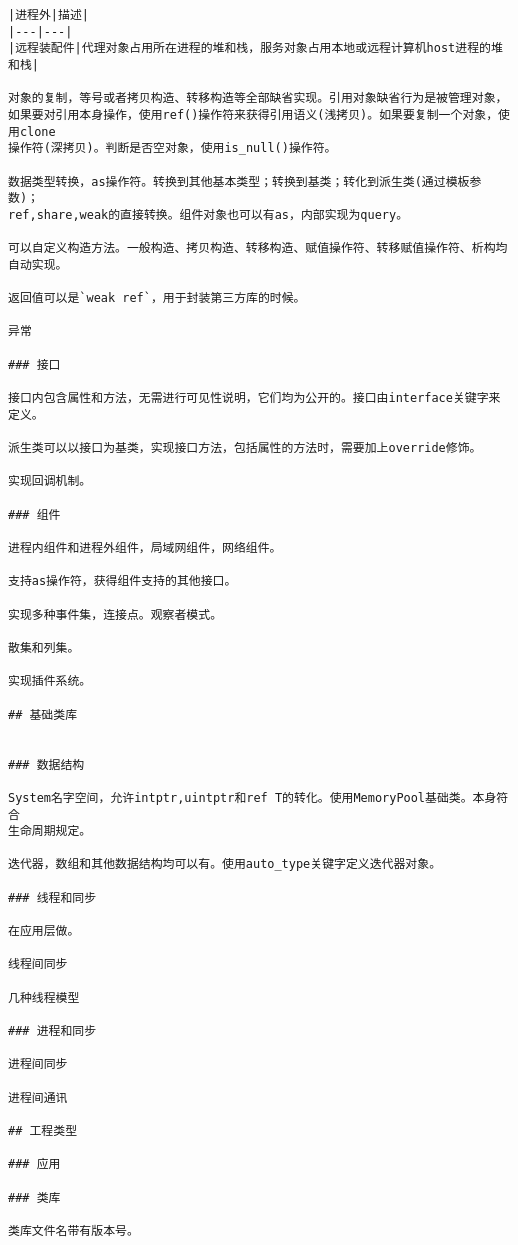 \begin{lstlisting}
|进程外|描述|
|---|---|
|远程装配件|代理对象占用所在进程的堆和栈，服务对象占用本地或远程计算机host进程的堆和栈|

对象的复制，等号或者拷贝构造、转移构造等全部缺省实现。引用对象缺省行为是被管理对象，
如果要对引用本身操作，使用ref()操作符来获得引用语义(浅拷贝)。如果要复制一个对象，使用clone
操作符(深拷贝)。判断是否空对象，使用is_null()操作符。

数据类型转换，as操作符。转换到其他基本类型；转换到基类；转化到派生类(通过模板参数)；
ref,share,weak的直接转换。组件对象也可以有as，内部实现为query。

可以自定义构造方法。一般构造、拷贝构造、转移构造、赋值操作符、转移赋值操作符、析构均自动实现。

返回值可以是`weak ref`，用于封装第三方库的时候。

异常

### 接口

接口内包含属性和方法，无需进行可见性说明，它们均为公开的。接口由interface关键字来定义。

派生类可以以接口为基类，实现接口方法，包括属性的方法时，需要加上override修饰。

实现回调机制。

### 组件

进程内组件和进程外组件，局域网组件，网络组件。

支持as操作符，获得组件支持的其他接口。

实现多种事件集，连接点。观察者模式。

散集和列集。

实现插件系统。

## 基础类库


### 数据结构

System名字空间，允许intptr,uintptr和ref T的转化。使用MemoryPool基础类。本身符合
生命周期规定。

迭代器，数组和其他数据结构均可以有。使用auto_type关键字定义迭代器对象。

### 线程和同步

在应用层做。

线程间同步

几种线程模型

### 进程和同步

进程间同步

进程间通讯

## 工程类型

### 应用

### 类库

类库文件名带有版本号。

\end{lstlisting}
